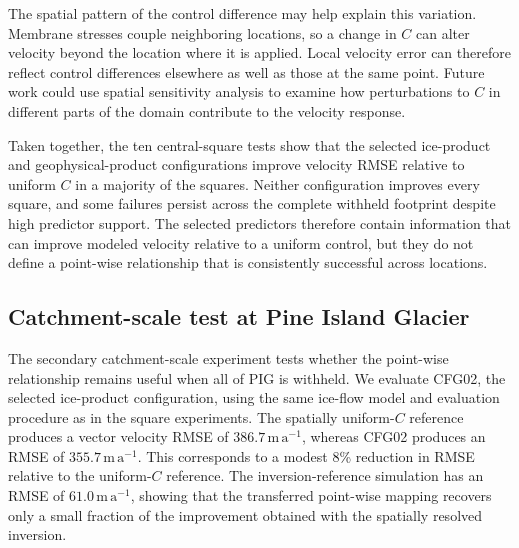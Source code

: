 \documentclass[review,jog]{igs}
\begin{document}
The spatial pattern of the control difference may help explain this
variation. Membrane stresses couple neighboring locations, so a
change in $C$ can alter velocity beyond the location where it is
applied. Local velocity error can therefore reflect control
differences elsewhere as well as those at the same point.
Future
work could use spatial sensitivity analysis to examine how
perturbations to $C$ in different parts of the domain contribute to
the velocity response.

Taken together, the ten central-square tests show that the selected
ice-product and geophysical-product configurations improve velocity
RMSE relative to uniform $C$ in a majority of the squares.
Neither configuration improves every square, and some failures
persist across the complete withheld footprint despite high
predictor support. The selected predictors therefore contain information that can improve modeled velocity relative to a uniform control, but they do not define a point-wise relationship that is consistently successful across locations.

\subsection{Catchment-scale test at Pine Island Glacier}

The secondary catchment-scale experiment tests whether the point-wise relationship remains useful when all of PIG is withheld. We evaluate CFG02, the selected ice-product configuration, using the same ice-flow model and evaluation procedure as in the square experiments. The
spatially uniform-$C$ reference produces a vector velocity RMSE of
$386.7\,\mathrm{m\,a^{-1}}$, whereas CFG02 produces an RMSE of
$355.7\,\mathrm{m\,a^{-1}}$. This corresponds to a modest 8\% reduction in
RMSE relative to the uniform-$C$ reference. The inversion-reference simulation has an RMSE of $61.0\,\mathrm{m\,a^{-1}}$, showing that the transferred point-wise mapping recovers only a small fraction of the improvement obtained with the spatially resolved inversion.
\end{document}
